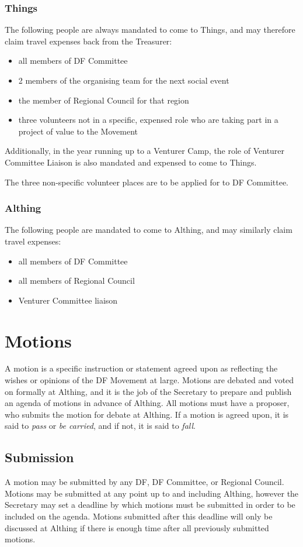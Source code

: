 \documentclass[a4paper, 11pt]{article} %
\begin{document}
\subsubsection{Things}
The following people are always mandated to come to Things, and may therefore claim travel expenses back from the Treasurer:
\begin{itemize}
\item all members of DF Committee
\item 2 members of the organising team for the next social event
\item the member of Regional Council for that region
\item three volunteers not in a specific, expensed role who are taking part in a project of value to the Movement
\end{itemize}

Additionally, in the year running up to a Venturer Camp, the role of Venturer Committee Liaison is also mandated and expensed to come to Things.

The three non-specific volunteer places are to be applied for to DF Committee.

\subsubsection{Althing}
The following people are mandated to come to Althing, and may similarly claim travel expenses:
\begin{itemize}
\item all members of DF Committee
\item all members of Regional Council
\item Venturer Committee liaison
\end{itemize}

\section{Motions}
A motion is a specific instruction or statement agreed upon as reflecting the wishes or opinions of the DF Movement at large.  Motions are debated and voted on formally at Althing, and it is the job of the Secretary to prepare and publish an agenda of motions in advance of Althing.  All motions must have a proposer, who submits the motion for debate at Althing. If a motion is agreed upon, it is said to \emph{pass} or \emph{be carried}, and if not, it is said to \emph{fall}.

\subsection{Submission}
A motion may be submitted by any DF, DF Committee, or Regional Council.  Motions may be submitted at any point up to and including Althing, however the Secretary may set a deadline by which motions must be submitted in order to be included on the agenda.  Motions submitted after this deadline will only be discussed at Althing if there is enough time after all previously submitted motions.
\end{document}
